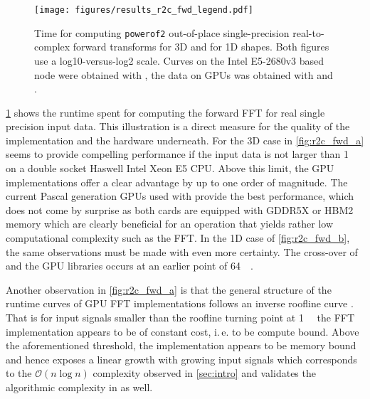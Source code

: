\begin{figure}[!tbp]
  \centering
  \texttt{[image: figures/results\_r2c\_fwd\_legend.pdf]}\vspace{-1em}
  \hfill
  \caption{Time for computing \texttt{powerof2} out-of-place single-precision real-to-complex forward transforms for 3D and for 1D shapes. Both figures use a log10-versus-log2 scale. Curves on the Intel E5-2680v3 based node were obtained with \fftw{}, the data on \nvidia{} GPUs was obtained with \cufft{} and \clfft{}.}
  \label{fig:r2c_fwd}
\end{figure}

\cref{fig:r2c_fwd} shows the runtime spent for computing the forward FFT for real single precision input data. This illustration is a direct measure for the quality of the implementation and the hardware underneath. For the 3D case in \cref{fig:r2c_fwd_a} \fftw{} seems to provide compelling performance if the input data is not larger than \SI{1}{\mebi\byte} on a double socket Haswell Intel Xeon E5 CPU. Above this limit, the GPU implementations offer a clear advantage by up to one order of magnitude. The current Pascal generation GPUs used with \cufft{} provide the best performance, which does not come by surprise as both cards are equipped with GDDR5X or HBM2 memory which are clearly beneficial for an operation that yields rather low computational complexity such as the FFT. In the 1D case of \cref{fig:r2c_fwd_b}, the same observations must be made with even more certainty. The cross-over of \fftw{} and the GPU libraries occurs at an earlier point of \SI{64}{\kibi\byte}.  

Another observation in \cref{fig:r2c_fwd_a} is that the general structure of the runtime curves of GPU FFT implementations follows an inverse roofline curve \cite{williams2009roofline}. That is for input signals smaller than the roofline turning point at \SI{1}{\mebi\byte} the FFT implementation appears to be of constant cost, i.\,e. to be compute bound. Above the aforementioned threshold, the implementation appears to be memory bound and hence exposes a linear growth with growing input signals which corresponds to the $\mathcal{O}(n \log n)$ complexity observed in \cref{sec:intro} and validates the algorithmic complexity in \citep{williams2009roofline} as well. 

